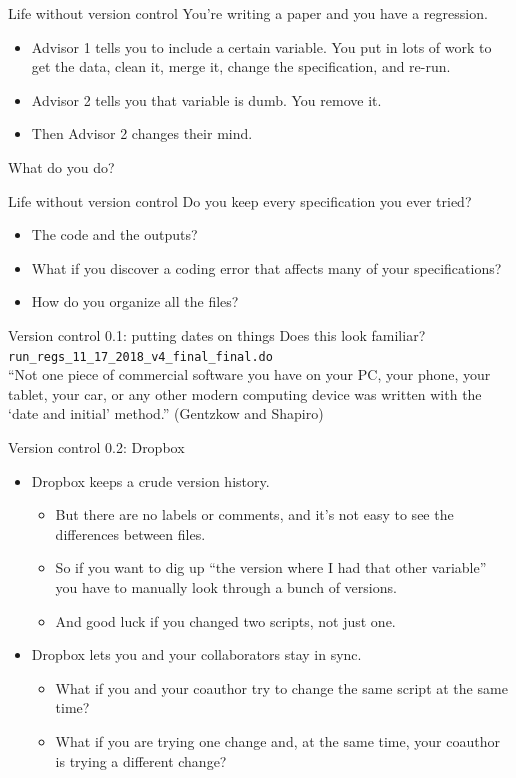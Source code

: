\documentclass{beamer}
\begin{document}
\begin{frame}{Life without version control}
You're writing a paper and you have a regression.
\begin{itemize}
\item Advisor 1 tells you to include a certain variable. You put in lots of work to get the data, clean it, merge it, change the specification, and re-run.
\item Advisor 2 tells you that variable is dumb. You remove it.
\item Then Advisor 2 changes their mind.
\end{itemize}
What do you do?
\end{frame}

\begin{frame}{Life without version control}
Do you keep every specification you ever tried?
\begin{itemize}
\item The code and the outputs?
\item What if you discover a coding error that affects many of your specifications?
\item How do you organize all the files?
\end{itemize}
\end{frame}

\begin{frame}{Version control 0.1: putting dates on things}
Does this look familiar?
\texttt{run\_regs\_11\_17\_2018\_v4\_final\_final.do}
\\
``Not one piece of commercial software you have on your PC, your phone, your tablet,
your car, or any other modern computing device was written with the `date and initial' method.'' (Gentzkow and Shapiro)
\end{frame}

\begin{frame}{Version control 0.2: Dropbox}
\begin{itemize}
\item Dropbox keeps a crude version history.
\begin{itemize}
\item But there are no labels or comments, and it's not easy to see the differences between files.
\item So if you want to dig up ``the version where I had that other variable'' you have to manually look through a bunch of versions.
\item And good luck if you changed two scripts, not just one.
\end{itemize}
\item Dropbox lets you and your collaborators stay in sync.
\begin{itemize}
\item What if you and your coauthor try to change the same script at the same time?
\item What if you are trying one change and, at the same time, your coauthor is trying a different change?
\end{itemize}
\end{itemize}
\end{frame}
\end{document}
